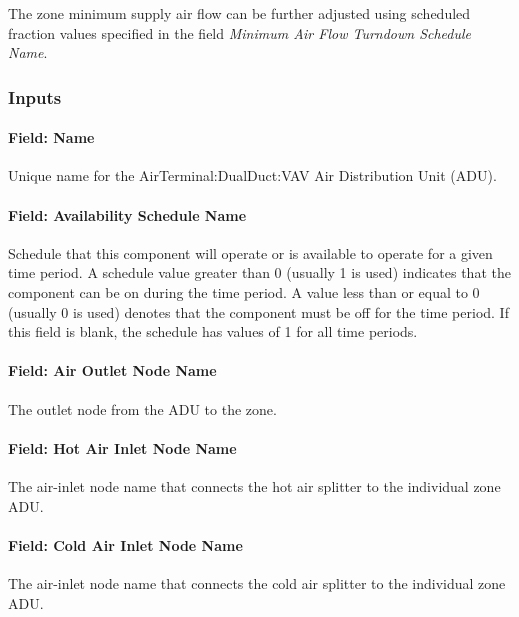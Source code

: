 The zone minimum supply air flow can be further adjusted using scheduled fraction values specified in the field \textit{Minimum Air Flow Turndown Schedule Name}.

\subsubsection{Inputs}\label{inputs-15-000}

\paragraph{Field: Name}\label{field-name-15}

Unique name for the AirTerminal:DualDuct:VAV Air Distribution Unit (ADU).

\paragraph{Field: Availability Schedule Name}\label{field-availability-schedule-name-12}

Schedule that this component will operate or is available to operate for a given time period. A schedule value greater than 0 (usually 1 is used) indicates that the component can be on during the time period. A value less than or equal to 0 (usually 0 is used) denotes that the component must be off for the time period. If this field is blank, the schedule has values of 1 for all time periods.

\paragraph{Field: Air Outlet Node Name}\label{field-air-outlet-node-name-8}

The outlet node from the ADU to the zone.

\paragraph{Field: Hot Air Inlet Node Name}\label{field-hot-air-inlet-node-name-1}

The air-inlet node name that connects the hot air splitter to the individual zone ADU.

\paragraph{Field: Cold Air Inlet Node Name}\label{field-cold-air-inlet-node-name-1}

The air-inlet node name that connects the cold air splitter to the individual zone ADU.

